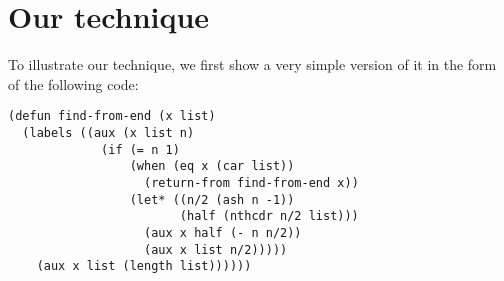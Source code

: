\section{Our technique}

To illustrate our technique, we first show a very simple version of it
in the form of the following code:

{\small\begin{verbatim}
(defun find-from-end (x list)
  (labels ((aux (x list n)
             (if (= n 1)
                 (when (eq x (car list))
                   (return-from find-from-end x))
                 (let* ((n/2 (ash n -1))
                        (half (nthcdr n/2 list)))
                   (aux x half (- n n/2))
                   (aux x list n/2)))))
    (aux x list (length list))))))
\end{verbatim}}
